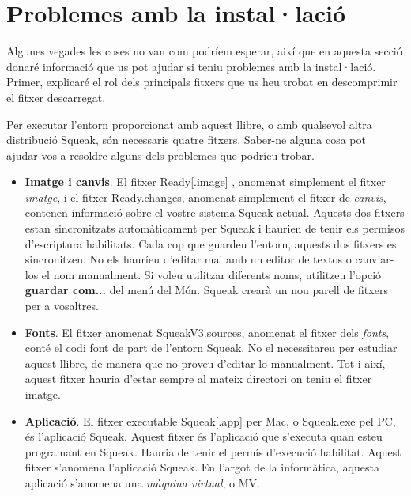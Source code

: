 \section{Problemes amb la instal·lació}
Algunes vegades les coses no van com podríem esperar, així que en aquesta secció donaré informació que us pot ajudar si teniu problemes amb la instal·lació. Primer, explicaré el rol dels principals fitxers que us heu trobat en descomprimir el fitxer descarregat.

Per executar l'entorn proporcionat amb aquest llibre, o amb qualsevol altra distribució Squeak, són necessaris quatre fitxers. Saber-ne alguna cosa pot ajudar-vos a resoldre alguns dels problemes que podríeu trobar.

\begin{itemize}
\item[] \textbf{Imatge i canvis}. El fitxer \textsf{Ready}[\textsf{.image}] , anomenat simplement el fitxer \emph{imatge}, i el fitxer \textsf{Ready.changes}, anomenat simplement el fitxer de \emph{canvis}, contenen informació sobre el vostre sistema Squeak actual. Aquests dos fitxers estan sincronitzats automàticament per Squeak i haurien de tenir els permisos d'escriptura habilitats. Cada cop que guardeu l'entorn, aquests dos fitxers es sincronitzen. No els hauríeu d'editar mai amb un editor de textos o canviar-los el nom manualment. Si voleu utilitzar diferents noms, utilitzeu l'opció \textbf{guardar com...} del menú del Món. Squeak crearà un nou parell de fitxers per a vosaltres.
\item[] \textbf{Fonts}. El fitxer anomenat \textsf{SqueakV3.sources}, anomenat el fitxer dels \emph{fonts}, conté el codi font de part de l'entorn Squeak. No el necessitareu per estudiar aquest llibre, de manera que no proveu d'editar-lo manualment. Tot i així, aquest fitxer hauria d'estar sempre al mateix directori on teniu el fitxer imatge.  
\item[] \textbf{Aplicació}. El fitxer executable \textsf{Squeak}[\textsf{.app}] per Mac, o \textsf{Squeak.exe} pel PC, és l'aplicació \textsf{Squeak}. Aquest fitxer és l'aplicació que s'executa quan esteu programant en Squeak. Hauria de tenir el permís d'execució habilitat. Aquest fitxer s'anomena l'aplicació \textsf{Squeak}. En l'argot de la informàtica, aquesta aplicació s'anomena una \emph{màquina virtual}, o MV.   
\end{itemize}

